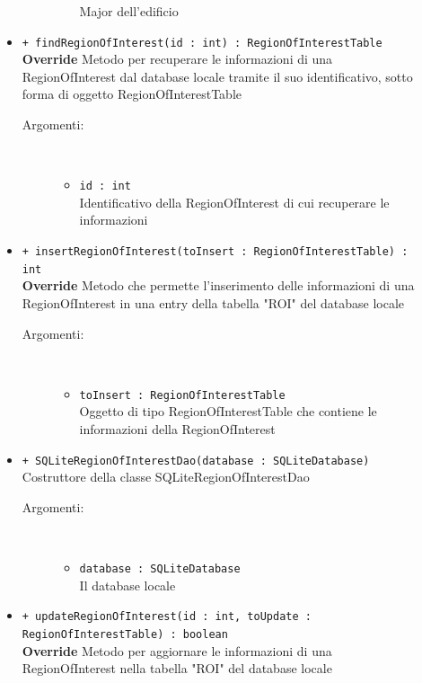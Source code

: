 \documentclass[../DefinizioneDiProdotto.tex]{subfiles}
\begin{document}
\begin{description}
\begin{itemize}
\begin{description}
\begin{itemize}
Major dell'edificio\end{itemize}
\end{description}
\item \texttt{+ findRegionOfInterest(id : int) : RegionOfInterestTable}\\
\textbf{Override} Metodo per recuperare le informazioni di una RegionOfInterest dal database locale tramite il suo identificativo, sotto forma di oggetto RegionOfInterestTable
 \begin{description}
\item[Argomenti:] \
\begin{itemize}
\item \texttt{id : int}\\
Identificativo della RegionOfInterest di cui recuperare le informazioni\end{itemize}
\end{description}
\item \texttt{+ insertRegionOfInterest(toInsert : RegionOfInterestTable) : int}\\
\textbf{Override} Metodo che permette l'inserimento delle informazioni di una RegionOfInterest in una entry della tabella "ROI" del database locale
 \begin{description}
\item[Argomenti:] \
\begin{itemize}
\item \texttt{toInsert : RegionOfInterestTable}\\
Oggetto di tipo RegionOfInterestTable che contiene le informazioni della RegionOfInterest\end{itemize}
\end{description}
\item \texttt{+ SQLiteRegionOfInterestDao(database : SQLiteDatabase)}\\
Costruttore della classe SQLiteRegionOfInterestDao
 \begin{description}
\item[Argomenti:] \
\begin{itemize}
\item \texttt{database : SQLiteDatabase}\\
Il database locale\end{itemize}
\end{description}
\item \texttt{+ updateRegionOfInterest(id : int, toUpdate : RegionOfInterestTable) : boolean}\\
\textbf{Override} Metodo per aggiornare le informazioni di una RegionOfInterest nella tabella "ROI" del database locale

\end{itemize}
\end{description}
\end{document}

